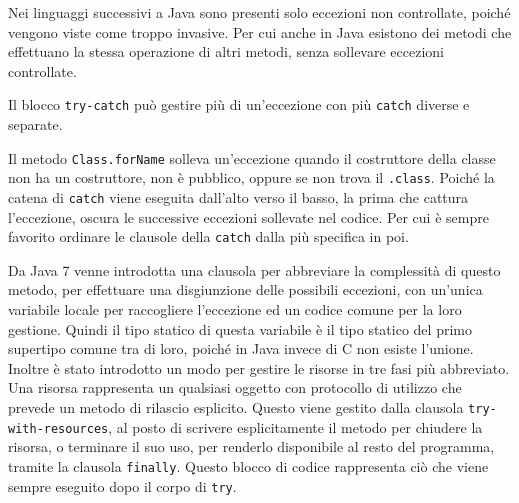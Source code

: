 \documentclass{article}
\numberwithin{equation}{subsection}
\begin{document}
Nei linguaggi successivi a Java sono presenti solo eccezioni non controllate, poiché vengono viste come troppo invasive. Per cui anche in Java esistono dei metodi che 
effettuano la stessa operazione di altri metodi, senza sollevare eccezioni controllate. 

Il blocco \verb|try-catch| può gestire più di un'eccezione con più \verb|catch| diverse e separate. 

Il metodo \verb|Class.forName| solleva un'eccezione quando il costruttore della classe non ha un costruttore, non è pubblico, oppure se non trova il \verb|.class|. 
Poiché la catena di \verb|catch| viene eseguita dall'alto verso il basso, la prima che cattura l'eccezione, oscura le successive eccezioni sollevate nel codice. 
Per cui è sempre favorito ordinare le clausole della \verb|catch| dalla più specifica in poi. 


Da Java 7 venne introdotta una clausola per abbreviare la complessità di questo  
metodo, per effettuare una disgiunzione delle possibili eccezioni, con un'unica variabile locale per raccogliere l'eccezione ed un codice comune per la loro gestione. 
Quindi il tipo statico di questa variabile è il tipo statico del primo supertipo comune tra di loro, poiché in Java invece di C non esiste l'unione. 
Inoltre è stato introdotto un modo per gestire le risorse in tre fasi più abbreviato. Una risorsa rappresenta un qualsiasi oggetto con protocollo di utilizzo che prevede 
un metodo di rilascio esplicito. Questo viene gestito dalla clausola \verb|try-with-resources|, al posto di scrivere esplicitamente il metodo per chiudere la risorsa, o 
terminare il suo uso, per renderlo disponibile al resto del programma, tramite la clausola \verb|finally|. 
Questo blocco di codice rappresenta ciò che viene sempre eseguito dopo il corpo di \verb|try|. 

\end{document}
